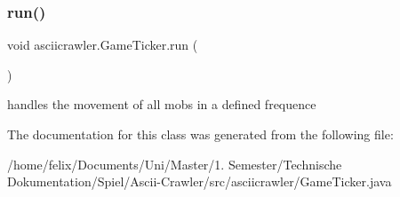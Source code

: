 \subsubsection{\texorpdfstring{run()}{run()}}
{\footnotesize\ttfamily void asciicrawler.\+Game\+Ticker.\+run (\begin{DoxyParamCaption}{ }\end{DoxyParamCaption})\hspace{0.3cm}{\ttfamily [inline]}}

handles the movement of all mobs in a defined frequence 

The documentation for this class was generated from the following file\+:\begin{DoxyCompactItemize}
\item 
/home/felix/\+Documents/\+Uni/\+Master/1. Semester/\+Technische Dokumentation/\+Spiel/\+Ascii-\/\+Crawler/src/asciicrawler/Game\+Ticker.\+java\end{DoxyCompactItemize}
